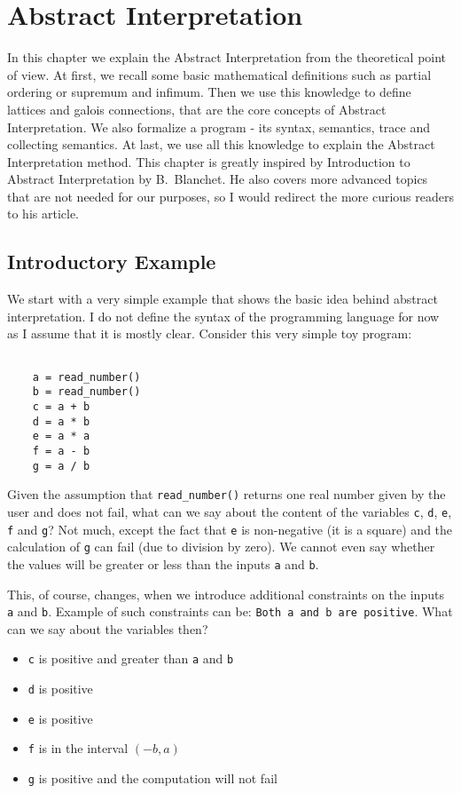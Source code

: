 \chapter{Abstract Interpretation}

In this chapter we explain the Abstract Interpretation from the theoretical point of view.
At first, we recall some basic mathematical definitions such as partial ordering or supremum and infimum.
Then we use this knowledge to define lattices and galois connections, that are the core concepts of Abstract
Interpretation.
We also formalize a program - its syntax, semantics, trace and collecting semantics.
At last, we use all this knowledge to explain the Abstract Interpretation method.
This chapter is greatly inspired by Introduction to Abstract Interpretation by B.~Blanchet\cite{Blanchet:2002:AI}.
He also covers more advanced topics that are not needed for our purposes, so I would redirect the more curious readers
to his article.


\section{Introductory Example} %

We start with a very simple example that shows the basic idea behind abstract interpretation.
I do not define the syntax of the programming language for now as I assume that it is mostly clear.
Consider this very simple toy program:

\begin{verbatim}

    a = read_number()
    b = read_number()
    c = a + b
    d = a * b
    e = a * a
    f = a - b
    g = a / b

\end{verbatim}

Given the assumption that \verb|read_number()| returns one real number given by the user and does not fail, what can
we say about the content of the variables \verb|c|, \verb|d|, \verb|e|, \verb|f| and \verb|g|?
Not much, except the fact that \verb|e| is non-negative (it is a square) and the calculation of \verb|g| can fail
(due to division by zero).
We cannot even say whether the values will be greater or less than the inputs \verb|a| and \verb|b|.

This, of course, changes, when we introduce additional constraints on the inputs \verb|a| and \verb|b|.
Example of such constraints can be: \verb|Both a and b are positive|.
What can we say about the variables then?
\begin{itemize}
    \item \verb|c| is positive and greater than \verb|a| and \verb|b|
    \item \verb|d| is positive
    \item \verb|e| is positive
    \item \verb|f| is in the interval $(-b, a)$
    \item \verb|g| is positive and the computation will not fail
\end{itemize}

